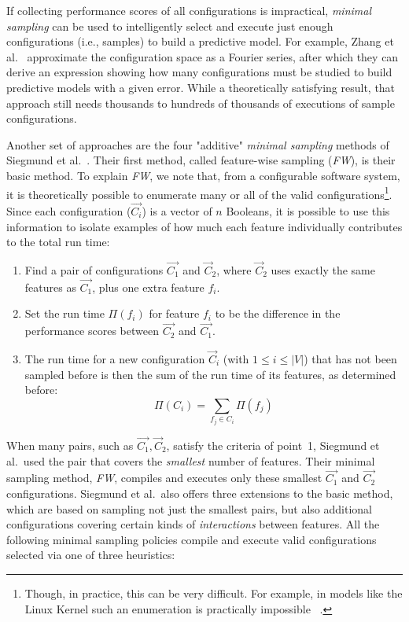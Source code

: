 \documentclass[smallextended]{svjour3}       %
\begin{document}
 If collecting performance scores of all configurations is impractical,  {\em minimal sampling} 
 can be used to intelligently select and execute just enough configurations (i.e., samples) to build a
 predictive model.
 For example, Zhang et al.~\cite{zhang2015performance} approximate the
configuration space as a Fourier series, after which they can derive an expression showing how many configurations must be studied
 to build predictive models with a given error. While a theoretically satisfying result, that approach still needs thousands to hundreds of thousands of executions of sample
 configurations.  

Another set of approaches are the four "additive" {\em minimal sampling} methods of Siegmund et al.~\cite{siegmund2012predicting}.
Their first method, called feature-wise sampling ({\em FW}), is their basic method.
To explain {\em FW}, we note that, from a configurable software system, it is theoretically possible to enumerate many or all of the valid configurations\footnote{Though, in practice, this can be very difficult. For example, in models like the Linux Kernel such an enumeration is practically impossible ~\cite{sayyad13b}.}. 
Since each configuration ($\vec{C_i}$) is a vector of $n$ Booleans, it  is possible to use this information to isolate examples of how much each feature individually contributes to the total run time:
\begin{enumerate}
\item Find a pair of  configurations $\vec{C_1}$ and $\vec{C}_2$, where $\vec{C}_2$ uses exactly the same features as $\vec{C_1}$, plus one  extra feature $f_i$.
\item Set the run time $\Pi(f_i)$ for feature $f_i$ to be the difference in the performance scores between $\vec{C_2}$ and $\vec{C_1}$.
\item The run time  for a new configuration  $\vec{C}_i$ (with $1\leq i\leq \left\vert{V}\right\vert$) that has not been sampled before is then the sum of the run time of its features, as determined before:
\begin{equation}
  \Pi(C_i) = \sum_{f_j \in C_i}\Pi(f_j)  
\end{equation}
\end{enumerate}

When many pairs, such as ${\vec{C_1},\vec{C}_2}$, satisfy the criteria of point~1, Siegmund et al.\ used the 
pair that covers the {\em smallest} number of features. Their minimal sampling method, {\em FW},
compiles and executes only these smallest ${\vec{C_1}}$ and ${\vec{C_2}}$ configurations. 
Siegmund et al.\ also offers three extensions to the basic method, which are based on sampling
not just the smallest  pairs, but also additional configurations covering certain kinds of {\em interactions} between features. 
All the following minimal sampling policies compile and   execute valid configurations selected via one of three heuristics:
\end{document}
